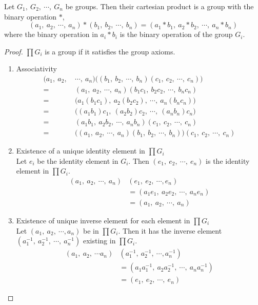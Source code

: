 \begin{theorem}
	Let $G_1,\ G_2,\ \cdots,\ G_n$ be groups.
	Then their cartesian product is a group with the binary operation $\ast$,
	$$ (a_1,\ a_2,\ \cdots,\ a_n) \ast (b_1,\ b_2,\ \cdots,\ b_n) = (a_1 \ast b_1,\ a_2 \ast b_2,\ \cdots,\ a_n \ast b_n) $$
	where the binary operation in  $a_i \ast b_i$ is the binary operation of the group $G_i$.
\end{theorem}
\begin{proof}
	$\prod G_i$ is a group if it satisfies the group axioms.
	\begin{enumerate}[label=G\arabic*]
		\item Associativity
			\begin{align*}
				(a_1,\ a_2,\ & \cdots,\ a_n) \big( (b_1,\ b_2,\ \cdots,\ b_n)(c_1,\ c_2,\ \cdots,\ c_n) \big) \\
				= & (a_1,\ a_2,\ \cdots,\ a_n)(b_1c_1,\ b_2c_2,\ \cdots,\ b_nc_n) \\
				= & \big( a_1(b_1c_1),\ a_2(b_2c_2),\ \cdots,\ a_n(b_nc_n) \big) \\
				= & \big( (a_1 b_1)c_1,\ (a_2b_2)c_2,\ \cdots,\ (a_nb_n )c_n \big) \\
				= &  (a_1b_1,\ a_2b_2,\ \cdots,\ a_nb_n)(c_1,\ c_2,\ \cdots,\ c_n) \\
				= & \big( (a_1,\ a_2,\ \cdots,\ a_n)(b_1,\ b_2,\ \cdots,\ b_n) \big)(c_1,\ c_2,\ \cdots,\ c_n)
			\end{align*}
		\item Existence of a unique identity element in $\prod G_i$\\
			Let $e_i$ be the identity element in $G_i$.
			Then $(e_1,\ e_2,\ \cdots,\ e_n)$ is the identity element in $\prod G_i$.
			\begin{align*}
				(a_1,\ a_2,\ \cdots,\ a_n)&(e_1,\ e_2,\ \cdots, e_n) \\
				& = (a_1e_1,\ a_2e_2,\ \cdots,\ a_ne_n) \\
				& = (a_1,\ a_2,\ \cdots,\ a_n)
			\end{align*}
		\item Existence of unique inverse element for each element in $\prod G_i$\\
			Let $(a_1,\ a_2,\ \cdots, a_n)$ be in $\prod G_i$.
			Then it has the inverse element $( a_1^{-1},\ a_2^{-1},\ \cdots,\ a_n^{-1} )$ existing in $\prod G_i$.
			\begin{align*}
				(a_1,\ a_2,\ \cdots a_n)&(a_1^{-1},\ a_2^{-1},\ \cdots, a_n^{-1}) \\
				& = (a_1a_1^{-1},\ a_2a_2^{-1},\ \cdots,\ a_na_n^{-1}) \\
				& = (e_1,\ e_2,\ \cdots,\ e_n)
			\end{align*}
	\end{enumerate}
\end{proof}

